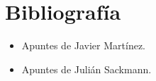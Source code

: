 \documentclass[]{article}
\begin{document}
%


\newpage
\section{Bibliografía}
\begin{itemize}
	\item Apuntes de Javier Martínez.
	\item Apuntes de Julián Sackmann.
\end{itemize}
\end{document}
